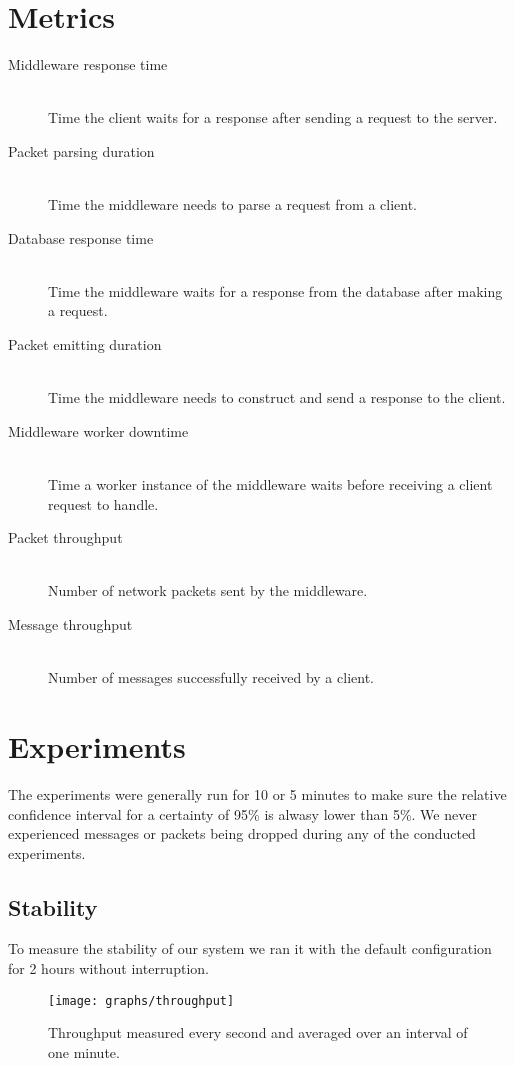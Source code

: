 \documentclass[a4paper, oneside]{csthesis}
\begin{document}
\section{Metrics}
	\begin{description}
		\item[Middleware response time] \ \\
		    Time the client waits for a response after sending a request to the server.
		\item[Packet parsing duration] \ \\
		    Time the middleware needs to parse a request from a client.
		\item[Database response time] \ \\
		    Time the middleware waits for a response from the database after making a request.
		\item[Packet emitting duration] \ \\
		    Time the middleware needs to construct and send a response to the client. 
		\item[Middleware worker downtime] \ \\
		    Time a worker instance of the middleware waits before receiving a client request to handle.
		\item[Packet throughput] \ \\
		    Number of network packets sent by the middleware.
		\item[Message throughput] \ \\
		    Number of messages successfully received by a client.
	\end{description}

\section{Experiments}
	The experiments were generally run for 10 or 5 minutes to make sure the relative confidence interval
	for a certainty of 95\% is alwasy lower than 5\%. We never experienced messages or packets being
	dropped during any of the conducted experiments.

\subsection{Stability}
	To measure the stability of our system we ran it with the default configuration for 2 hours without
	interruption. 

    \begin{figure}[ht]
    \centering
        \texttt{[image: graphs/throughput]}
        \caption{Throughput measured every second and averaged over an interval of one minute.}
        \label{fig:throughput}
    \end{figure}
\end{document}
